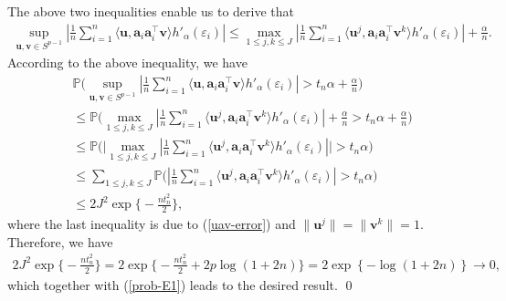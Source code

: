 \documentclass{article}
\numberwithin{equation}{section}
\begin{document}
The above two inequalities enable us to derive that
\begin{equation}\label{norm2-number}
	\begin{aligned}
		\sup_{\mathbf{u},\mathbf{v}\in S^{p-1}} |\frac{1}{n}\sum_{i=1}^n \langle \mathbf{u}, \mathbf{a}_i\mathbf{a}_i^\top\mathbf{v}\rangle h'_{\alpha}(\varepsilon_i) |
		\leq
		\max_{1\leq j,k\leq J}|\frac{1}{n}\sum_{i=1}^n \langle \mathbf{u}^j, \mathbf{a}_i\mathbf{a}_i^\top\mathbf{v}^k\rangle h'_{\alpha}(\varepsilon_i)|
		+\frac{\alpha}{n}.
	\end{aligned}\nonumber
\end{equation}
According to the above inequality, we have
\begin{equation}
	\begin{aligned}
		&\mathbb{P}\Big( \sup_{\mathbf{u},\mathbf{v}\in S^{p-1}} |\frac{1}{n}\sum_{i=1}^n\langle \mathbf{u}, \mathbf{a}_i\mathbf{a}_i^\top\mathbf{v}\rangle h'_{\alpha}(\varepsilon_i) |>
		t_n\alpha+\frac{\alpha}{n}\Big)\\
	&	\leq \mathbb{P}\Big( \max_{1\leq j,k\leq J}|\frac{1}{n}\sum_{i=1}^n \langle \mathbf{u}^j, \mathbf{a}_i\mathbf{a}_i^\top\mathbf{v}^k\rangle h'_{\alpha}(\varepsilon_i)|
		+\frac{\alpha}{n}>t_n\alpha+\frac{\alpha}{n}\Big)\\
	&	\leq \mathbb{P}\big( \big| \max_{1\leq j,k\leq J}|\frac{1}{n}\sum_{i=1}^n \langle \mathbf{u}^j, \mathbf{a}_i\mathbf{a}_i^\top\mathbf{v}^k\rangle h'_{\alpha}(\varepsilon_i)|\big|>t_n\alpha\big)
		\\
	&	\leq \sum_{1\leq j,k\leq J}\mathbb{P}\big(  |\frac{1}{n}\sum_{i=1}^n \langle \mathbf{u}^j, \mathbf{a}_i\mathbf{a}_i^\top\mathbf{v}^k\rangle h'_{\alpha}(\varepsilon_i)|>
		t_n\alpha\big)
		\\
	&	\leq 2J^2\exp\big\lbrace -\frac{nt_n^2}{2}\big\rbrace,
	\end{aligned}\nonumber
\end{equation}
where the last inequality is due to (\ref{uav-error}) and $\|\mathbf{u}^j\|=\|\mathbf{v}^k\|=1$. Therefore, we  have
\begin{equation}
	\begin{aligned}
		2J^2\exp\Big\lbrace -\frac{nt_n^2}{2}\Big\rbrace =2\exp\Big\lbrace-\frac{nt_n^2}{2}+2p\log(1+2n) \Big\rbrace  
		= 2\exp\left\lbrace-\log(1+2n)\right\rbrace\to 0,	\end{aligned}\nonumber
\end{equation}
which together with (\ref{prob-E1}) leads to the desired result. \qed
	
		
\end{document}
